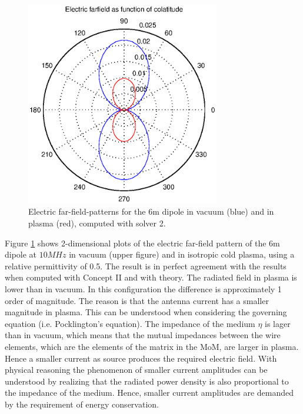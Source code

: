 \documentclass[two-coloumn,ras]{agutex}
\begin{document}
\begin{article}
\begin{figure}
  \noindent\includegraphics[width=20pc]{ff_10mhz.eps}
\caption{Electric far-field-patterns for the 6m dipole in vacuum (blue) and in plasma (red), computed with solver 2.}
\label{fig:patterns_vacuum}
\end{figure}

Figure \ref{fig:patterns_vacuum} shows 2-dimensional plots of the electric far-field pattern of the 6m dipole at $10 MHz$ in vacuum (upper figure) and in isotropic cold plasma, using a relative permittivity of 0.5. The result is in perfect agreement with the results when computed with Concept II and with theory. The radiated field in plasma is lower than in vacuum. In this configuration the difference is approximately 1 order of magnitude. The reason is that the antenna current has a smaller magnitude in plasma. This can be understood when considering the governing equation (i.e. Pocklington's equation). The impedance of the medium $\eta$ is lager than in vacuum, which means that the mutual impedances between the wire elements, which are the elements of the matrix in the MoM, are larger in plasma. Hence a smaller current as source produces the required electric field. With physical reasoning the phenomenon of smaller current amplitudes can be understood by realizing that the radiated power density is also proportional to the impedance of the medium. Hence, smaller current amplitudes are demanded by the requirement of energy conservation.\\ 


\end{article}
\end{document}
